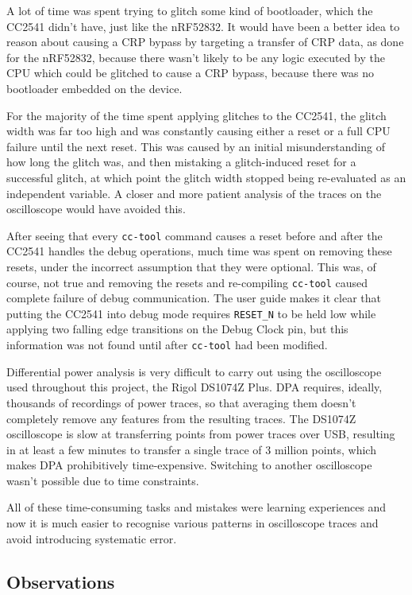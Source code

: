 A lot of time was spent trying to glitch some kind of bootloader, which
the CC2541 didn't have, just like the nRF52832. It would have been a
better idea to reason about causing a CRP bypass by targeting a transfer
of CRP data, as done for the nRF52832, because there wasn't likely to be
any logic executed by the CPU which could be glitched to cause a CRP
bypass, because there was no bootloader embedded on the device.

For the majority of the time spent applying glitches to the CC2541, the
glitch width was far too high and was constantly causing either a reset
or a full CPU failure until the next reset. This was caused by an
initial misunderstanding of how long the glitch was, and then mistaking
a glitch-induced reset for a successful glitch, at which point the
glitch width stopped being re-evaluated as an independent variable. A
closer and more patient analysis of the traces on the oscilloscope would
have avoided this.

After seeing that every \texttt{cc-tool} command causes a reset before
and after the CC2541 handles the debug operations, much time was spent
on removing these resets, under the incorrect assumption that they were
optional. This was, of course, not true and removing the resets and
re-compiling \texttt{cc-tool} caused complete failure of debug
communication. The user guide makes it clear that putting the CC2541
into debug mode requires \texttt{RESET\_N} to be held low while applying
two falling edge transitions on the Debug Clock pin, but this
information was not found until after \texttt{cc-tool} had been
modified.

Differential power analysis is very difficult to carry out using the
oscilloscope used throughout this project, the Rigol DS1074Z Plus. DPA
requires, ideally, thousands of recordings of power traces, so that
averaging them doesn't completely remove any features from the resulting
traces. The DS1074Z oscilloscope is slow at transferring points from
power traces over USB, resulting in at least a few minutes to transfer a
single trace of 3 million points, which makes DPA prohibitively
time-expensive. Switching to another oscilloscope wasn't possible due to
time constraints.

All of these time-consuming tasks and mistakes were learning experiences
and now it is much easier to recognise various patterns in oscilloscope
traces and avoid introducing systematic error.

\hypertarget{observations}{%
\subsection{\texorpdfstring{Observations\label{section_cc2541_observations}}{Observations}}\label{observations}}

